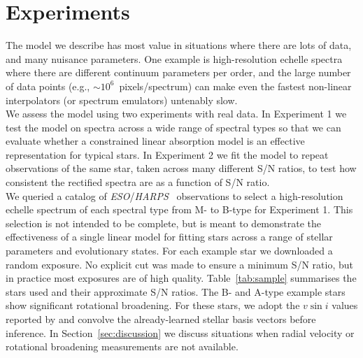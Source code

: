 \documentclass[modern,linenumbers]{aastex631}
\newcommand{\project}[1]{\textit{#1}}
\newcommand{\eso}{\project{ESO}}
\newcommand{\harps}{\project{HARPS}}
\renewcommand{\added}[1]{#1}
\begin{document}
\section{Experiments} \label{sec:experiments}

The model we describe has most value in situations where there are lots of data, and many nuisance parameters. One example is high-resolution echelle spectra where there are different continuum parameters per order, and the large number of data points (e.g., $\sim10^6$~pixels/spectrum) can make even the fastest non-linear interpolators (or spectrum emulators) untenably slow.\\

We assess the model using two experiments with real data. In Experiment 1 we test the model on spectra across a wide range of spectral types so that we can evaluate whether a constrained linear absorption model is an effective representation for typical stars. In Experiment 2 we fit the model to repeat observations of the same star, taken across many different S/N ratios, to test how consistent the rectified spectra are as a function of S/N ratio.\\


We queried a catalog of \eso/\harps\ \citep{2003Msngr.114...20M} observations to select a high-resolution echelle spectrum of each spectral type from M- to B-type for Experiment 1. This selection is not intended to be complete, but is meant to demonstrate the effectiveness of a single linear model for fitting stars across a range of stellar parameters and evolutionary states. For each example star we downloaded a random exposure. No explicit cut was made to ensure a minimum S/N ratio, but in practice most exposures are of high quality. \added{Table~\ref{tab:sample} summarises the stars used and their approximate S/N ratios.} The B- and A-type example stars show significant rotational broadening. For these stars, we adopt the $v\sin{i}$ values reported by \citet{Barbieri:2023} and convolve the \added{already-learned} stellar basis vectors before inference. In Section~\ref{sec:discussion} we discuss situations when radial velocity or rotational broadening measurements are not available.\\
\end{document}
